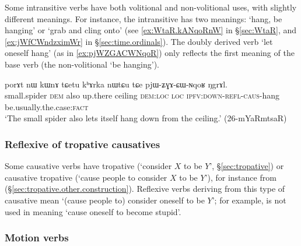 Some intransitive verbs have both volitional and non-volitional uses, with slightly different meanings. For instance, the intransitive  has two meanings: `hang, be hanging' or `grab and cling onto' (see \ref{ex:WtaR.kANqoRnW} in §\ref{sec:WtaR}, and \ref{ex:jWfCWndzximWr} in §\ref{sec:time.ordinals}). The doubly derived verb  `let oneself hang' (as in \ref{ex:pjWZGACWNqoR}) only reflects the first meaning of the base verb  (the non-volitional `be hanging').
\largerpage
\begin{exe}
\ex \label{ex:pjWZGACWNqoR}
\gll  porɤt nɯ kɯnɤ tɕetu kʰɤrka nɯtɕu tɕe pjɯ-ʑɣɤ-ɕɯ-ɴqoʁ ŋgrɤl. \\
small.spider \textsc{dem} also up.there ceiling \textsc{dem}:\textsc{loc} \textsc{loc} \textsc{ipfv}:\textsc{down}-\textsc{refl}-\textsc{caus}-hang be.usually.the.case:\textsc{fact} \\
\glt `The small spider also lets itself hang down from the ceiling.' (26-mYaRmtsaR) 
 \end{exe}
 
 

% 
 
 
 
\subsubsection{Reflexive of tropative causatives} \label{sec:refl.trop.caus}
Some causative verbs have tropative (`consider $X$ to be $Y$', §\ref{sec:tropative}) or causative tropative (`cause people to consider $X$ to be $Y$'), for instance  from  (§\ref{sec:tropative.other.construction}). Reflexive verbs deriving from this type of causative mean `(cause people to) consider oneself to be $Y$'; for example,  is not used in meaning `cause oneself to become stupid'.
 
 
 \subsubsection{Motion verbs} \label{sec:refl.caus.motion}

